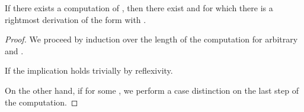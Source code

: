 \begin{isabellebody}
\begin{isamarkuptext}
\begin{lemma}[Step 1]\label{char_imp_derivers}
If there exists a computation  of 
, then there exist  and  for which there is a rightmost
derivation of the form  with
\isa{\isafree{{\isasymgamma}}\ {\isacharequal}{\kern0pt}\ \isafree{{\isasymgamma}{\isacharprime}{\kern0pt}}\ {\isacharat}{\kern0pt}\ \isafree{{\isasymalpha}}}.
\begin{proof}
We proceed by induction over the length  of the computation for arbitrary \isa{{\isasymgamma}{\isacharcomma}{\kern0pt}\ {\isasymalpha}{\isacharcomma}{\kern0pt}\ {\isasymbeta}{\isacharcomma}{\kern0pt}} and . 

If  the implication holds trivially by reflexivity.

On the other hand, if  for some , we perform a case distinction on the last step of
the computation.


\end{proof}
\end{lemma}
\end{isamarkuptext}
\end{isabellebody}
